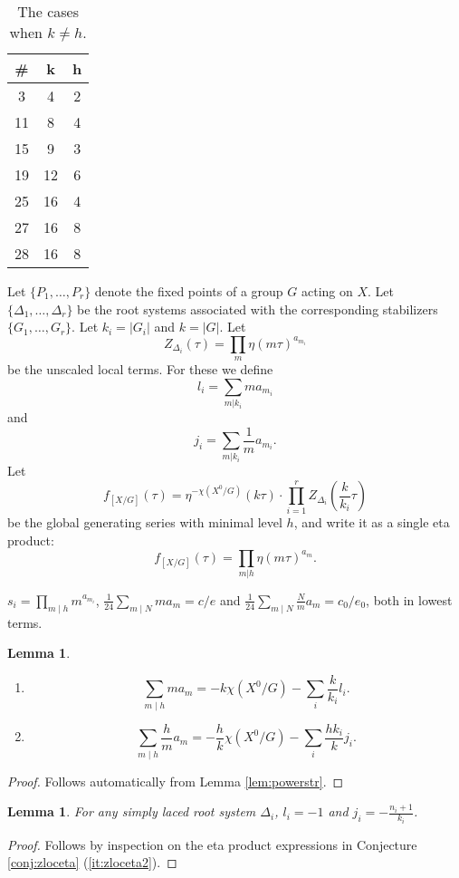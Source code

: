 \documentclass[11pt,a4paper]{amsart}
\newtheorem{lemma}[theorem]{Lemma}
\theoremstyle{definition}
\begin{document}
\begin{table}

\begin{tabular}{|c|c|c|}
	\hline 
	\# & k & h \\
	\hline
	3 & 4 & 2 \\
	11 & 8 & 4 \\
	15 & 9 & 3 \\
	19 & 12 & 6 \\
	25 & 16 & 4 \\
	27 & 16 & 8\\
	28 & 16 & 8 \\
	\hline
\end{tabular}
	\vspace{0.2in}
\caption{The cases when $k \neq h$.}
	\label{table:kh}
\end{table}

Let $\{P_1,\dots,P_r\}$ denote the fixed points of a group $G$ acting on $X$. Let $\{ \Delta_1, \dots, \Delta_r \}$ be the  root systems associated with the corresponding stabilizers $\{ G_1,\dots,G_r \}$. Let $k_i=|G_i|$ and $k=|G|$. Let 
\[Z_{\Delta_i}(\tau)=\prod_m \eta(m \tau )^{a_{m_i}}\] be the unscaled local terms. For these we define 
\[ l_{i}= \sum_{m|k_i}ma_{m_i} \]
and
\[ j_{i}= \sum_{m|k_i}\frac{1}{m}a_{m_i}. \]
Let
\[ f_{[X/G]}(\tau)=\eta^{-\chi(X^0/G)}(k \tau) \cdot \prod_{i=1}^r Z_{\Delta_i}\left(\frac{k}{k_i} \tau\right) \]
be the global generating series with minimal level $h$, and write it as a single eta product:
\[ f_{[X/G]}(\tau)=\prod_{m|h} \eta(m \tau )^{a_{m}}. \]




$s_i=\prod_{m \mid h} m^{a_{m_i}}$,  $\frac{1}{24}\sum_{m \mid N} ma_m=c/e$ and $\frac{1}{24}\sum_{m \mid N} \frac{N}{m}a_m=c_0/e_0$, both in lowest terms.
\begin{lemma}
\label{lem:covpresum} 
\begin{enumerate}
\item\label{it:covpresum1} 
\[ \sum_{m \mid h} ma_m=-k\chi(X^0/G)-\sum_{i}\frac{k}{k_i}l_i. \]
\item\label{it:covpresum2} 
\[ \sum_{m \mid h} \frac{h}{m}a_m=-\frac{h}{k}\chi(X^0/G)-\sum_{i}\frac{hk_i}{k}j_i. \]
	
\end{enumerate}
\end{lemma}
\begin{proof}
Follows automatically from Lemma \ref{lem:powerstr}.
\end{proof}

\begin{lemma} 
\label{lem:liji}
For any simply laced root system $\Delta_i$, $l_i=-1$ and $j_i=-\frac{n_i+1}{k_i}$.
\end{lemma}
\begin{proof}
Follows by inspection on the eta product expressions in Conjecture \ref{conj:zloceta} (\ref{it:zloceta2}).
\end{proof}
\end{document}
